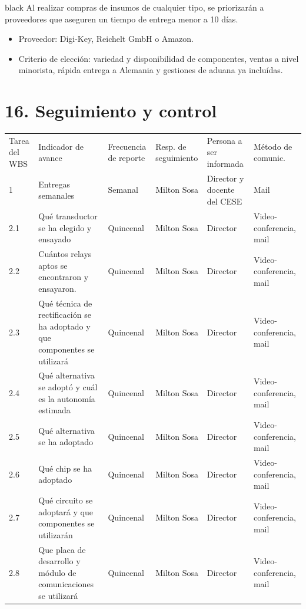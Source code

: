 \documentclass[11pt]{charter}
\begin{document}
\begin{consigna}{black}
Al realizar compras de insumos de cualquier tipo, se priorizarán a proveedores que aseguren un tiempo de entrega menor a 10 días.
\begin{itemize}
\item Proveedor: Digi-Key, Reichelt GmbH o Amazon.
\item Criterio de elección: variedad y disponibilidad de componentes, ventas a nivel minorista, rápida entrega a Alemania y gestiones de aduana ya incluídas.
\end{itemize}
\end{consigna}

\section{16. Seguimiento y control}
\label{sec:seguimiento}
\begin{table}[H]
\centering
\begin{tabularx}{\linewidth}{@{}|X|X|X|X|X|X|@{}}
\hline
\rowcolor[HTML]{C0C0C0} 
\multicolumn{6}{|c|}{\cellcolor[HTML]{C0C0C0}SEGUIMIENTO DE AVANCE}                                                                       \\ \hline
\rowcolor[HTML]{C0C0C0} 
Tarea del WBS & Indicador de avance & Frecuencia de reporte & Resp. de seguimiento & Persona a ser informada & Método de comunic. \\ \hline
 1&Entregas semanales& Semanal&Milton Sosa& Director y docente del CESE&Mail\\ \hline
 2.1&Qué transductor se ha elegido y ensayado&Quincenal&Milton Sosa&Director&Video-conferencia, mail\\ \hline
 2.2&Cuántos relays aptos se encontraron y ensayaron.&Quincenal&Milton Sosa&Director&Video-conferencia, mail\\ \hline
 2.3&Qué técnica de rectificación se ha adoptado y que componentes se utilizará&Quincenal&Milton Sosa&Director& Video-conferencia, mail\\ \hline
 2.4&Qué alternativa se adoptó y cuál es la autonomía estimada&Quincenal&Milton Sosa&Director&Video-conferencia, mail\\ \hline
 2.5&Qué alternativa se ha adoptado&Quincenal&Milton Sosa&Director&Video-conferencia, mail\\ \hline
 2.6&Qué chip se ha adoptado&Quincenal&Milton Sosa&Director&Video-conferencia, mail\\ \hline
 2.7&Qué circuito se adoptará y que componentes se utilizarán&Quincenal&Milton Sosa&Director&Video-conferencia, mail\\ \hline
 2.8&Que placa de desarrollo y módulo de comunicaciones se utilizará&Quincenal&Milton Sosa&Director&Video-conferencia, mail\\ \hline
\end{tabularx}%
\end{table}
\end{document}
